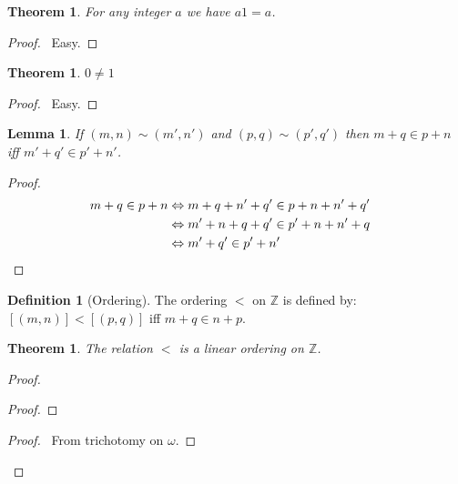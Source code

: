 \documentclass{report}
\let\qed\relax
\newtheorem{lemma}[axiom]{Lemma}
\newtheorem{theorem}[axiom]{Theorem}
\theoremstyle{definition}
\newtheorem{definition}[axiom]{Definition}
\begin{document}
    \begin{theorem}
        For any integer $a$ we have $a1= a$.
    \end{theorem}

    \begin{proof}
        \pf\ Easy. \qed
    \end{proof}

    \begin{theorem}
        $0 \neq 1$
    \end{theorem}

    \begin{proof}
        \pf\ Easy. \qed
    \end{proof}

    \begin{lemma}
        If $(m,n) \sim (m',n')$ and $(p,q) \sim (p',q')$ then $m + q \in p + n$ iff
        $m' + q' \in p' + n'$.
    \end{lemma}

    \begin{proof}
        \pf
        \begin{align*}
            m + q \in p + n & \Leftrightarrow m + q + n' + q' \in p + n + n' + q' \\
            & \Leftrightarrow m' + n + q + q' \in p' + n + n' + q \\
            & \Leftrightarrow m' + q' \in p' + n' & \qed
        \end{align*}
    \end{proof}

    \begin{definition}[Ordering]
        The ordering $<$ on $\mathbb{Z}$ is defined by: $[(m,n)] < [(p,q)]$ iff $m + q \in n + p$.
    \end{definition}

    \begin{theorem}
        The relation $<$ is a linear ordering on $\mathbb{Z}$.
    \end{theorem}

    \begin{proof}
        \pf
        \begin{proof}
        \end{proof}
        \begin{proof}
            \pf\ From trichotomy on $\omega$.
        \end{proof}
        \qed
    \end{proof}
\end{document}
